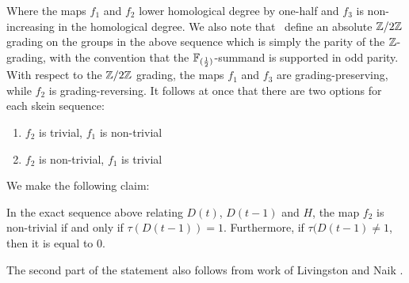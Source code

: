 Where the maps $f_1$ and $f_2$ lower homological degree by one-half and $f_3$ is non-increasing in the homological degree.  We also note that \ons \ define an absolute $\mathbb{Z}/2\mathbb{Z}$ grading on the groups in the above sequence which is simply the parity of the $\mathbb{Z}$-grading, with the convention that the $\mathbb F_{(\frac{1}{2})}$-summand is supported in odd parity.  With respect to the $\mathbb{Z}/2\mathbb{Z}$ grading, the maps $f_1$ and $f_3$ are grading-preserving, while $f_2$ is grading-reversing.  It follows at once that there are two options for each skein sequence:

\begin{enumerate}
	\item $f_2$ is trivial, $f_1$ is non-trivial
	\item $f_2$ is non-trivial, $f_1$ is trivial
\end{enumerate}
We make the following claim:

\begin{prop}
	\label{prop:skein}
 In the exact sequence above relating $D(t)$, $D(t-1)$ and $H$, the map $f_2$ is non-trivial if and only if  $\tau(D(t-1))=1$.  Furthermore, if $\tau(D(t-1)\ne1$, then it is equal to $0$.
\end{prop}

 The second part of the statement also follows from work of Livingston and Naik \cite{Livingston2}.

